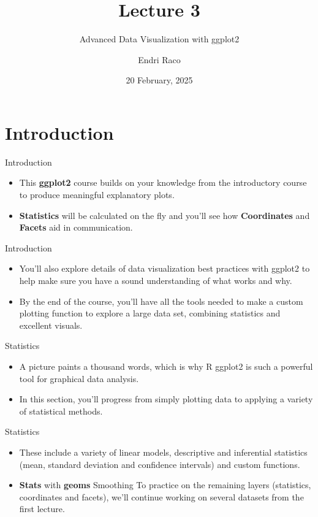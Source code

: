 \documentclass[
  ignorenonframetext,
]{beamer}
\title{Lecture 3}
\subtitle{Advanced Data Visualization with ggplot2}
\author{Endri Raco}
\date{20 February, 2025}
\begin{document}
\frame{\titlepage}

\begin{frame}[allowframebreaks]
  \tableofcontents[hideallsubsections]
\end{frame}
\section{Introduction}\label{introduction}

\begin{frame}{Introduction}
\label{introduction-1}
\begin{itemize}
\item
  This \textbf{ggplot2} course builds on your knowledge from the
  introductory course to produce meaningful explanatory plots.
\item
  \textbf{Statistics} will be calculated on the fly and you'll see how
  \textbf{Coordinates} and \textbf{Facets} aid in communication.
\end{itemize}
\end{frame}

\begin{frame}{Introduction}
\label{introduction-2}
\begin{itemize}
\item
  You'll also explore details of data visualization best practices with
  ggplot2 to help make sure you have a sound understanding of what works
  and why.
\item
  By the end of the course, you'll have all the tools needed to make a
  custom plotting function to explore a large data set, combining
  statistics and excellent visuals.
\end{itemize}
\end{frame}

\begin{frame}{Statistics}
\label{statistics}
\begin{itemize}
\item
  A picture paints a thousand words, which is why R ggplot2 is such a
  powerful tool for graphical data analysis.
\item
  In this section, you'll progress from simply plotting data to applying
  a variety of statistical methods.
\end{itemize}
\end{frame}

\begin{frame}{Statistics}
\label{statistics-1}
\begin{itemize}
\item
  These include a variety of linear models, descriptive and inferential
  statistics (mean, standard deviation and confidence intervals) and
  custom functions.
\item
  \textbf{Stats} with \textbf{geoms} Smoothing To practice on the
  remaining layers (statistics, coordinates and facets), we'll continue
  working on several datasets from the first lecture.
\end{itemize}
\end{frame}
\end{document}

